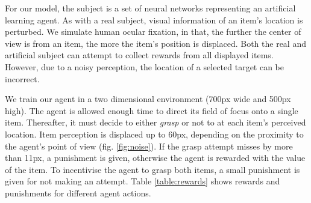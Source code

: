 \documentclass[11]{article}
\begin{document}
For our model, the subject is a set of neural networks representing an artificial learning agent. 
As with a real subject, visual information of an item's location is perturbed. 
We simulate human ocular fixation, in that, the further the center of view is from an item, the more the item's position is displaced. 
Both the real and artificial subject can attempt to collect rewards from all displayed items. 
However, due to a noisy perception, the location of a selected target can be incorrect. 

We train our agent in a two dimensional environment (700px wide and 500px high). 
The agent is allowed enough time to direct its field of focus onto a single item.
Thereafter, it must decide to either \textit{grasp} or not to at each item's perceived location.
Item perception is displaced up to 60px, depending on the proximity to the agent's point of view (fig. \ref{fig:noise}).
If the grasp attempt misses by more than 11px, a punishment is given, otherwise the agent is rewarded with the value of the item. 
To incentivise the agent to grasp both items, a small punishment is given for not making an attempt.
Table \ref{table:rewards} shows rewards and punishments for different agent actions.
\end{document}
